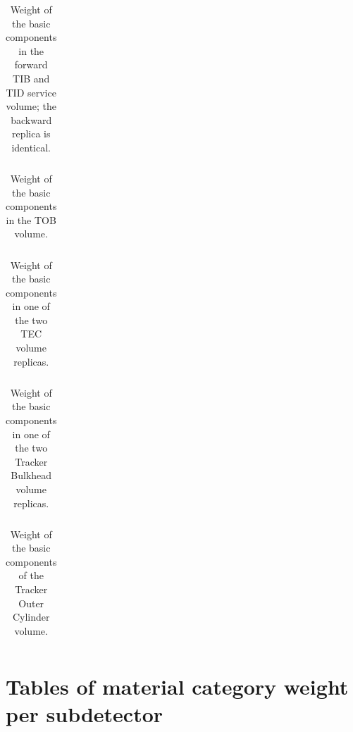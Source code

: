\documentclass{cmspaper}
\begin{document}
\begin{table}[h]
\begin{center}
\begin{tabular}{clrrrrrr}

\end{tabular}
\caption{Weight of the basic components in the forward TIB and TID service volume; the backward replica is identical.}
\end{center}
\end{table}

\begin{table}[h]
\begin{center}
\begin{tabular}{clrrrrrr}

\end{tabular}
\caption{Weight of the basic components in the TOB volume.}
\end{center}
\end{table}

\begin{table}[h]
\begin{center}
\begin{tabular}{clrrrrrr}

\end{tabular}
\caption{Weight of the basic components in one of the two TEC volume replicas.}
\end{center}
\end{table}

\begin{table}[h]
\begin{center}
\begin{tabular}{clrrrrrr}

\end{tabular}
\caption{Weight of the basic components in one of the two Tracker Bulkhead volume replicas.}
\end{center}
\end{table}

\begin{table}[h]
\begin{center}
\begin{tabular}{clrrrrrr}

\end{tabular}
\caption{Weight of the basic components of the Tracker Outer Cylinder volume.}
\end{center}
\end{table}

\clearpage

\section{Tables of material category weight per subdetector}
\label{categoriesAppendix}
\end{document}

